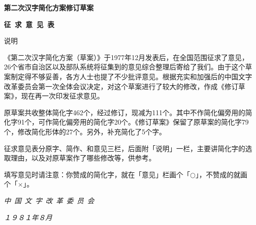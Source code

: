 \documentclass[12pt, fontset=none, UTF8, AutoFakeBold]{ctexbook}
\newcommand{\raisesymbol}[1]{\raise1.3pt\hbox{#1}}
\begin{document}
\begin{titlepage}
    \begin{center}
        \huge
        \vspace*{3cm}
        \textbf{第二次汉字简化方案修订草案}\par
        \textbf{征\ 求\ 意\ 见\ 表}\par
        \vspace*{2.5cm}
        \Large
        说\qquad{}明\par
    \end{center}

    《第二次汉字简化方案（草案）》于1977年12月发表后，在全国范围征求了意见，26个省市自治区以及部队系统将征集到的意见综合整理后寄给了我们。由于这个草案制定得不够妥善，各方人士也提了不少批评意见。根据充实和加强后的中国文字改革委员会第一次全体会议决定，对这个草案进行了较大的修改，作成《修订草案》，现在再一次印发征求意见。

    原草案共收整体简化字462个，经过修订，现减为111个。其中不作简化偏旁用的简化字91个，可作简化偏旁用的简化字20个。《修订草案》保留了原草案的简化字79个，修改简化形体的27个。另外，补充简化了5个字。

    征求意见表分原字、简作、和意见三栏，后面附「说明」一栏，主要讲简化字的选取理由，以及对原草案作了哪些修改等，供参考。

    填写意见时请注意：你赞成的简化字，就在「意见」栏画个「\raisesymbol{$\bigcirc$}」，不赞成的就画个「\raisesymbol{$\times$}」。

    \begin{center}
        \Large
        \vspace*{1.5cm}
        \textit{中\ 国\ 文\ 字\ 改\ 革\ 委\ 员\ 会}\par
        \textit{１９８１年８月}
    \end{center}
\end{titlepage}

\end{document}
